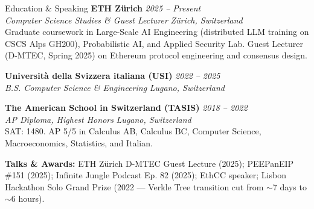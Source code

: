 \documentclass[10pt]{resume}
\begin{document}

\begin{rSection}{Education \& Speaking}
	\textbf{ETH Z\"urich} \hfill \textit{2025 -- Present} \\
	\textit{Computer Science Studies \& Guest Lecturer} \hfill \textit{Z\"urich, Switzerland} \\
	Graduate coursework in Large-Scale AI Engineering (distributed LLM training on CSCS Alps GH200), Probabilistic AI, and Applied Security Lab. Guest Lecturer (D-MTEC, Spring 2025) on Ethereum protocol engineering and consensus design.

	\textbf{Universit\`a della Svizzera italiana (USI)} \hfill \textit{2022 -- 2025} \\
	\textit{B.S. Computer Science \& Engineering} \hfill \textit{Lugano, Switzerland}

	\textbf{The American School in Switzerland (TASIS)} \hfill \textit{2018 -- 2022} \\
	\textit{AP Diploma, Highest Honors} \hfill \textit{Lugano, Switzerland} \\
	SAT: 1480. AP 5/5 in Calculus AB, Calculus BC, Computer Science, Macroeconomics, Statistics, and Italian.

	\textbf{Talks \& Awards:} ETH Z\"urich D-MTEC Guest Lecture (2025); PEEPanEIP \#151 (2025); Infinite Jungle Podcast Ep. 82 (2025); EthCC speaker; Lisbon Hackathon Solo Grand Prize (2022 --- Verkle Tree transition cut from $\sim$7 days to $\sim$6 hours).
\end{rSection}
\end{document}
